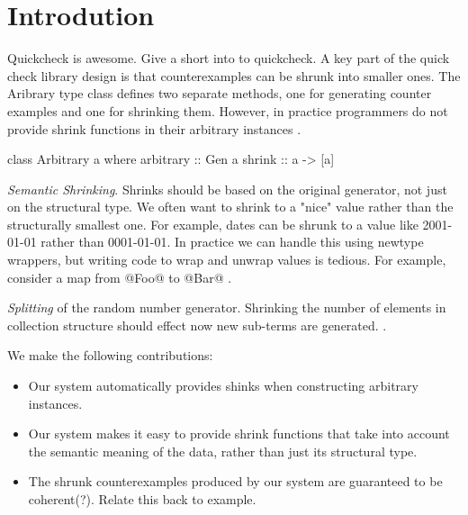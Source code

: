 \section{Introdution}

Quickcheck\cite{claessen:quickcheck} is awesome. Give a short into to quickcheck. A key part of the quick check library design is that counterexamples can be shrunk into smaller ones. The Aribrary type class defines two separate methods, one for generating counter examples and one for shrinking them. However, in practice programmers do not provide shrink functions in their arbitrary instances . 

\begin{code}
  class Arbitrary a where
   arbitrary :: Gen a
   shrink    :: a -> [a]
\end{code}




\emph{Semantic Shrinking}. Shrinks should be based on the original generator, not just on the structural type. We often want to shrink to a "nice" value rather than the structurally smallest one. For example, dates can be shrunk to a value like 2001-01-01 rather than 0001-01-01. In practice we can handle this using newtype wrappers, but writing code to wrap and unwrap values is tedious. For example, consider a map from @Foo@ to @Bar@ . 

\emph{Splitting} of the random number generator. Shrinking the number of elements in collection structure should effect now new sub-terms are generated. .


We make the following contributions:
\begin{itemize}
\item Our system automatically provides shinks when constructing arbitrary instances.

\item Our system makes it easy to provide shrink functions that take into account the semantic meaning of the data, rather than just its structural type.

\item The shrunk counterexamples produced by our system are guaranteed to be coherent(?). Relate this back to example.
\end{itemize}
